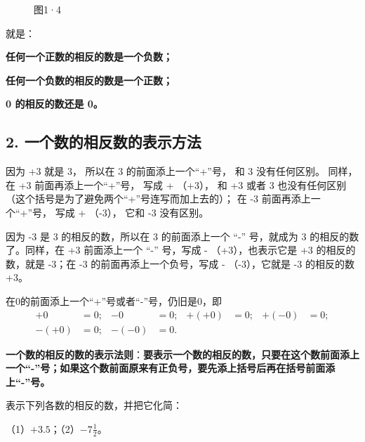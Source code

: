 \begin{figure}
\centering
\caption{图1·4}
\end{figure}


就是：

\textbf{任何一个正数的相反的数是一个负数；}

\textbf{任何一个负数的相反的数是一个正数；}

\textbf{0 的相反的数还是 0。}

\subsection{2. 一个数的相反数的表示方法}

因为 +3 就是 3， 所以在 3 的前面添上一个``+''号， 和 3 没有任何区别。
同样， 在 +3 前面再添上一个``+''号， 写成 + （+3）， 和 +3 或者 3
也没有任何区别 （这个括号是为了避免两个``+''号连写而加上去的）； 在 -3
前面再添上一个``+''号， 写成 + （-3）， 它和 -3 没有区别。

因为 -3 是 3 的相反的数，所以在 3 的前面添上一个 ``-'' 号，就成为 3
的相反的数了。同样，在 +3 前面添上一个 ``-'' 号，写成 -
（+3），也表示它是 +3 的相反的数，就是 -3；在 -3
的前面再添上一个负号，写成 - （-3），它就是 -3 的相反的数 +3。

在0的前面添上一个``+''号或者``-''号，仍旧是0，即
\[
\begin{aligned}
+0 &= 0; & -0 &= 0; & +(+0) &= 0; & +(-0) &= 0; \\
-(+0) &= 0; & -(-0) &= 0.
\end{aligned}
\]

\textbf{一个数的相反的数的表示法则}：\textbf{要表示一个数的相反的数，只要在这个数前面添上一个``-''号；如果这个数前面原来有正负号，要先添上括号后再在括号前面添上``-''号。}

 表示下列各数的相反的数，并把它化简：

（1）\(+3.5\)；\qquad （2）\(-7\frac{1}{2}\)。

